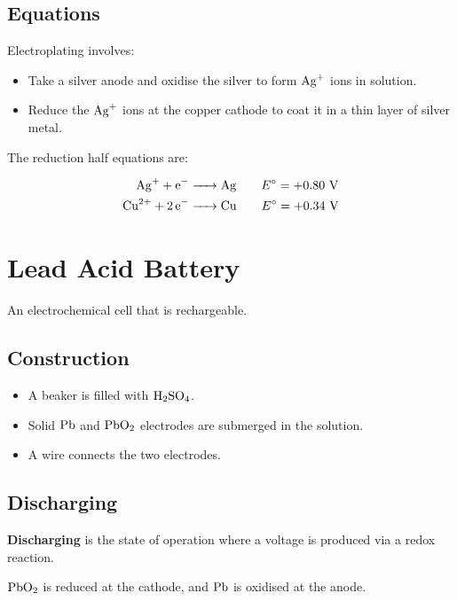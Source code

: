 \documentclass[a4paper,11pt]{article}
\begin{document}
\subsection{Equations}

Electroplating involves:

\begin{itemize}
\item Take a silver anode and oxidise the silver to form $\ce{Ag+}$ ions in
	solution.
\item Reduce the $\ce{Ag+}$ ions at the copper cathode to coat it in a thin
	layer of silver metal.
\end{itemize}

The reduction half equations are:

$$
\begin{aligned}
\ce{Ag+ + e- & -> Ag} \qquad E^\circ = +0.80\text{ V} \\
\ce{Cu^{2+} + 2e- & -> Cu} \qquad E^\circ = +0.34\text{ V} \\
\end{aligned}
$$



\section{Lead Acid Battery}

An electrochemical cell that is rechargeable.

\subsection{Construction}


\begin{itemize}
\item A beaker is filled with $\ce{H2SO4}$.
\item Solid $\ce{Pb}$ and $\ce{PbO2}$ electrodes are submerged in the solution.
\item A wire connects the two electrodes.
\end{itemize}

\subsection{Discharging}

\textbf{Discharging} is the state of operation where a voltage is produced via
a redox reaction.

$\ce{PbO2}$ is reduced at the cathode, and $\ce{Pb}$ is oxidised at the anode.
\end{document}
